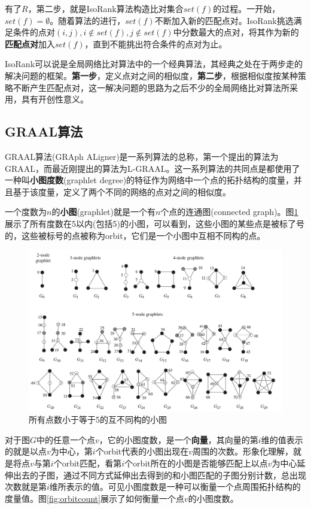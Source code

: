 有了$R$，第二步，就是IsoRank算法构造比对集合$set(f)$的过程。一开始，$set(f)=\emptyset$。随着算法的进行，$set(f)$不断加入新的匹配点对。IsoRank挑选满足条件的点对$(i,j),i\notin set(f),j\notin set(f)$中分数最大的点对，将其作为新的\textbf{匹配点对}加入$set(f)$，直到不能挑出符合条件的点对为止。

IsoRank可以说是全局网络比对算法中的一个经典算法，其经典之处在于两步走的解决问题的框架。\textbf{第一步}，定义点对之间的相似度，\textbf{第二步}，根据相似度按某种策略不断产生匹配点对，这一解决问题的思路为之后不少的全局网络比对算法所采用，具有开创性意义。
\subsection{GRAAL算法}
GRAAL算法(GRAph ALigner)是一系列算法的总称，第一个提出的算法为GRAAL\cite{kuchaiev2010topological}，而最近刚提出的算法为L-GRAAL\cite{malod2015graal}。这一系列算法的共同点是都使用了一种叫\textbf{小图度数}(graphlet degree)的特征作为网络中一个点的拓扑结构的度量，并且基于该度量，定义了两个不同的网络的点对之间的相似度。

一个度数为$n$的\textbf{小图}(graphlet)就是一个有$n$个点的连通图(connected graph)。图\ref{fig:graphlet}展示了所有度数在5以内(包括5)的小图，可以看到，这些小图的某些点是被标了号的，这些被标号的点被称为orbit，它们是一个小图中互相不同构的点。

\begin{figure}[htbp]
\centering
\includegraphics[width=\textwidth]{pic/graphlet.png}
\caption{所有点数小于等于5的互不同构的小图\cite{kuchaiev2010topological}}\label{fig:graphlet}
\end{figure}

对于图$G$中的任意一个点$v$，它的小图度数，是一个\textbf{向量}，其向量的第$i$维的值表示的就是以点$v$为中心，第$i$个orbit代表的小图出现在$v$周围的次数。形象化理解，就是将点$v$与第$i$个orbit匹配，看第$i$个orbit所在的小图是否能够匹配上以点$v$为中心延伸出去的子图，通过不同方式延伸出去得到的和小图匹配的子图分别计数，总出现次数就是第$i$维所表示的值。可见小图度数是一种可以衡量一个点周围拓扑结构的度量值。图\ref{fig:orbitcount}展示了如何衡量一个点$v$的小图度数。

